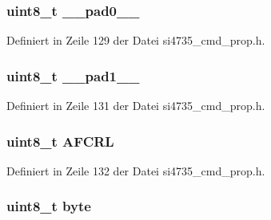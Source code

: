 \subsubsection[{\+\_\+\+\_\+pad0\+\_\+\+\_\+}]{\setlength{\rightskip}{0pt plus 5cm}uint8\+\_\+t \+\_\+\+\_\+pad0\+\_\+\+\_\+}\label{unionfm__rsq__status__resp2_a8b4eebe79ded0459acec2f4950102ba3}


Definiert in Zeile 129 der Datei si4735\+\_\+cmd\+\_\+prop.\+h.

\hypertarget{unionfm__rsq__status__resp2_a77f12d2e278bd5c07712648ac0df5e08}{}
\subsubsection[{\+\_\+\+\_\+pad1\+\_\+\+\_\+}]{\setlength{\rightskip}{0pt plus 5cm}uint8\+\_\+t \+\_\+\+\_\+pad1\+\_\+\+\_\+}\label{unionfm__rsq__status__resp2_a77f12d2e278bd5c07712648ac0df5e08}


Definiert in Zeile 131 der Datei si4735\+\_\+cmd\+\_\+prop.\+h.

\hypertarget{unionfm__rsq__status__resp2_aec3ecfbd976645f2d3d4067f32271635}{}
\subsubsection[{A\+F\+C\+R\+L}]{\setlength{\rightskip}{0pt plus 5cm}uint8\+\_\+t A\+F\+C\+R\+L}\label{unionfm__rsq__status__resp2_aec3ecfbd976645f2d3d4067f32271635}


Definiert in Zeile 132 der Datei si4735\+\_\+cmd\+\_\+prop.\+h.

\hypertarget{unionfm__rsq__status__resp2_a96f44d20f1dbf1c8785a7bc99a46164c}{}
\subsubsection[{byte}]{\setlength{\rightskip}{0pt plus 5cm}uint8\+\_\+t byte}\label{unionfm__rsq__status__resp2_a96f44d20f1dbf1c8785a7bc99a46164c}


